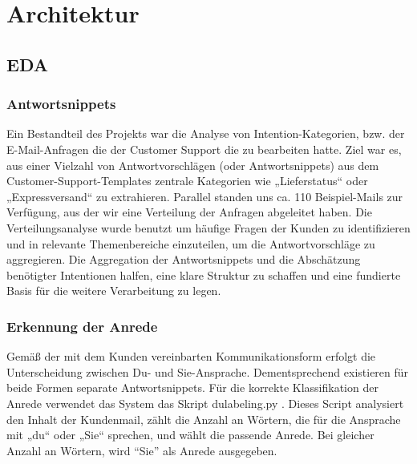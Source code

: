 \chapter{Architektur}


\section{EDA}

\subsection{Antwortsnippets}


Ein  Bestandteil des Projekts war die Analyse von Intention-Kategorien, bzw. der E-Mail-Anfragen 
die der Customer Support die zu bearbeiten hatte. Ziel war es, aus einer Vielzahl von Antwortvorschlägen 
(oder Antwortsnippets) aus dem Customer-Support-Templates zentrale Kategorien wie „Lieferstatus“ oder 
„Expressversand“ zu extrahieren. Parallel standen uns ca. 110 Beispiel-Mails zur Verfügung, aus der wir 
eine Verteilung der Anfragen abgeleitet haben. Die Verteilungsanalyse wurde benutzt um häufige Fragen 
der Kunden zu identifizieren und in relevante Themenbereiche einzuteilen, um die Antwortvorschläge zu 
aggregieren. Die Aggregation der Antwortsnippets und die Abschätzung benötigter Intentionen halfen, 
eine klare Struktur zu schaffen und eine fundierte Basis für die weitere Verarbeitung zu legen.

\subsection{Erkennung der Anrede}

Gemäß der mit dem Kunden vereinbarten Kommunikationsform erfolgt die Unterscheidung
zwischen Du- und Sie-Ansprache. Dementsprechend existieren für beide Formen separate
Antwortsnippets. Für die korrekte Klassifikation der Anrede verwendet das System das
Skript du\textunderscore labeling.py . Dieses Script analysiert den Inhalt der Kundenmail,
zählt die Anzahl an Wörtern, die für die Ansprache mit „du“ oder „Sie“ sprechen, und wählt
die passende Anrede. Bei gleicher Anzahl an Wörtern, wird “Sie” als Anrede ausgegeben. 

